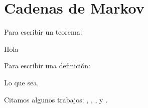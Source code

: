 \chapter{Cadenas de Markov} %


\noindent \lipsum[1-9]

Para escribir un teorema:

\begin{theorem}
    Hola
\end{theorem}

Para escribir una definición:

\begin{definition}
    Lo que sea.
\end{definition}

Citamos algunos trabajos: \cite{Williams91}, \cite{JacodProtter02}, \cite{Etemadi81}, \cite{Norris97} y \cite{Hoel72}.